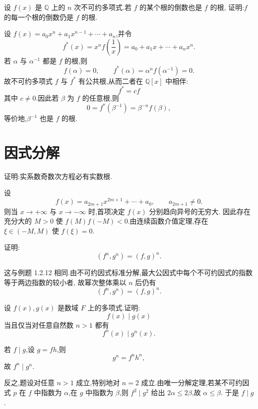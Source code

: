 \begin{example}
设 $f(x)$ 是 $\mathbb{Q}$ 上的 $n$ 次不可约多项式.若 $f$ 的某个根的倒数也是 $f$ 的根,
证明:$f$ 的每一个根的倒数仍是 $f$ 的根.
\end{example}
\exampleblank

\begin{solution}
设 $f(x)=a_0x^n+a_1x^{n-1}+\cdots+a_n$,并令
\[
  f^*(x)=x^n f\left(\dfrac1x\right)
  =a_0+a_1x+\cdots+a_nx^n.
\]
若 $\alpha$ 与 $\alpha^{-1}$ 都是 $f$ 的根,则
\[
  f(\alpha)=0,
  \qquad
  f^*(\alpha)=\alpha^n f(\alpha^{-1})=0.
\]
故不可约多项式 $f$ 与 $f^*$ 有公共根,从而二者在 $\mathbb{Q}[x]$ 中相伴:
\[
  f^*=cf
\]
其中 $c\ne0$.因此若 $\beta$ 为 $f$ 的任意根,则
\[
  0=f^*(\beta^{-1})=\beta^{-n}f(\beta),
\]
等价地,$\beta^{-1}$ 也是 $f$ 的根.
\end{solution}


\newpage

\section{因式分解}

\begin{example}[\markstar]
证明:实系数奇数次方程必有实数根.
\end{example}
\exampleblank

\begin{solution}
设
\[
  f(x)=a_{2m+1}x^{2m+1}+\cdots+a_0,
  \qquad a_{2m+1}\ne0.
\]
则当 $x\to+\infty$ 与 $x\to-\infty$ 时,首项决定 $f(x)$ 分别趋向异号的无穷大.
因此存在充分大的 $M>0$ 使 $f(M)f(-M)<0$.由连续函数介值定理,存在
$\xi\in(-M,M)$ 使 $f(\xi)=0$.
\end{solution}

\begin{example}
证明:
\[
  (f^n,g^n)=(f,g)^n.
\]
\end{example}
\exampleblank

\begin{solution}
这与例题 1.2.12 相同.由不可约因式标准分解,最大公因式中每个不可约因式的指数等于两边指数的较小者,
故幂次整体乘以 $n$ 后仍有
\[
  (f^n,g^n)=(f,g)^n.
\]
\end{solution}

\begin{example}
设 $f(x),g(x)$ 是数域 $F$ 上的多项式.证明:
\[
  f(x)\mid g(x)
\]
当且仅当对任意自然数 $n>1$ 都有
\[
  f^n(x)\mid g^n(x).
\]
\end{example}
\exampleblank

\begin{solution}
若 $f\mid g$,设 $g=fh$,则
\[
  g^n=f^nh^n,
\]
故 $f^n\mid g^n$.

反之,题设对任意 $n>1$ 成立,特别地对 $n=2$ 成立.由唯一分解定理,若某不可约因式 $p$ 在 $f$ 中指数为
$\alpha$,在 $g$ 中指数为 $\beta$,则 $f^2\mid g^2$ 给出 $2\alpha\le2\beta$,故 $\alpha\le\beta$.
于是 $f\mid g$.
\end{solution}

